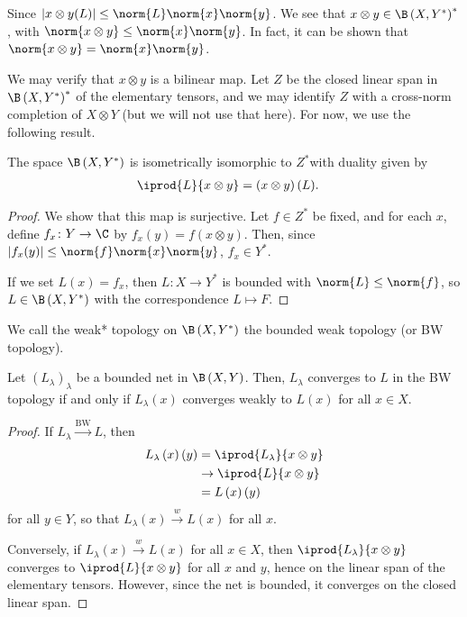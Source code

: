\documentclass[10pt]{mypackage}
\begin{document}
Since $\left\vert x\otimes y(L) \right\vert \leq \norm{L}\norm{x}\norm{y}$. We see that $x\otimes y\in \B\left( X,Y^{\ast} \right)^{\ast}$, with $\norm{x\otimes y} \leq \norm{x}\norm{y}$. In fact, it can be shown that $\norm{x\otimes y} = \norm{x}\norm{y}$.\newline

We may verify that $x\otimes y$ is a bilinear map. Let $Z$ be the closed linear span in $\B\left( X,Y^{\ast} \right)^{\ast}$ of the elementary tensors, and we may identify $Z$ with a cross-norm completion of $X\otimes Y$ (but we will not use that here). For now, we use the following result.
\begin{lemma}
  The space $\B\left( X,Y^{\ast} \right)$ is isometrically isomorphic to $Z^{\ast}$with duality given by
  \begin{align*}
    \iprod{L}{x\otimes y} &= \left( x\otimes y \right)(L).
  \end{align*}
\end{lemma}
\begin{proof}
  We show that this map is surjective. Let $f\in Z^{\ast}$ be fixed, and for each $x$, define $f_x\colon Y\rightarrow \C$ by $f_x(y) = f\left( x\otimes y \right)$. Then, since $\left\vert f_x(y) \right\vert\leq \norm{f}\norm{x}\norm{y}$, $f_x\in Y^{\ast}$.\newline

  If we set $L(x) = f_x$, then $L\colon X\rightarrow Y^{\ast}$ is bounded with $\norm{L}\leq \norm{f}$, so $L\in \B\left( X,Y^{\ast} \right)$ with the correspondence $L\mapsto F$.
\end{proof}
We call the weak* topology on $\B\left( X,Y^{\ast} \right)$ the bounded weak topology (or BW topology).
\begin{lemma}
  Let $\left( L_{\lambda} \right)_{\lambda}$ be a bounded net in $\B\left( X, Y\right)$. Then, $L_{\lambda}$ converges to $L$ in the BW topology if and only if $L_{\lambda}(x)$ converges weakly to $L(x)$ for all $x\in X$.
\end{lemma}
\begin{proof}
  If $L_{\lambda}\xrightarrow{\text{BW}} L$, then
  \begin{align*}
    L_{\lambda}\left( x \right)\left( y \right) &= \iprod{L_{\lambda}}{x\otimes y}\\
                                                &\rightarrow \iprod{L}{x\otimes y}\\
                                                &= L\left( x \right)\left( y \right)
  \end{align*}
  for all $y\in Y$, so that $L_{\lambda}(x)\xrightarrow{w} L(x)$ for all $x$.\newline

  Conversely, if $L_{\lambda}(x)\xrightarrow{w} L(x)$ for all $x\in X$, then $ \iprod{L_{\lambda}}{x\otimes y} $ converges to $ \iprod{L}{x\otimes y} $ for all $x$ and $y$, hence on the linear span of the elementary tensors. However, since the net is bounded, it converges on the closed linear span.
\end{proof}
\end{document}
